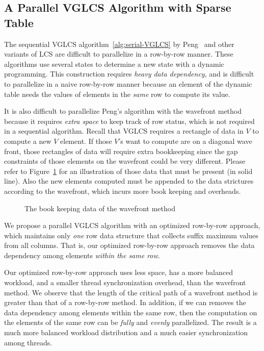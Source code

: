 \subsection{A Parallel VGLCS Algorithm with Sparse Table}

The sequential VGLCS algorithm~\ref{alg:serial-VGLCS} by
Peng~\cite{Peng2011TheLC} and other variants of LCS are difficult to
parallelize in a row-by-row manner.  These algorithms use several
states to determine a new state with a dynamic programming.  This
construction requires {\em heavy data dependency}, and is difficult to
parallelize in a naive row-by-row manner because an element of the
dynamic table needs the values of elements in the {\em same} row to
compute its value.

It is also difficult to parallelize Peng's algorithm with the
wavefront method because it requires {\em extra space} to keep track
of row status, which is not required in a sequential algorithm.
Recall that VGLCS requires a rectangle of data in $V$ to compute a new
$V$ element.  If those $V$'s want to compute are on a diagonal wave
front, those rectangles of data will require extra bookkeeping since
the gap constraints of those elements on the wavefront could be very
different.  Please refer to Figure~\ref{fig:fig-VGLCS-dp-wavefront}
for an illustration of those data that must be present (in solid
line).  Also the new elements computed must be appended to the data
strictures according to the wavefront, which incurs more book keeping
and overheads.

\begin{figure}[!thb]
  \centering {} 
  \caption{The book keeping data of the wavefront method}
  \label{fig:fig-VGLCS-dp-wavefront}
\end{figure}

We propose a parallel VGLCS algorithm with an optimized row-by-row
approach, which maintains only {\em one} row data structure that
collects suffix maximum values from all columns.  That is, our
optimized row-by-row approach removes the data dependency among
elements {\em within the same row}.

Our optimized row-by-row approach uses less space, has a more balanced
workload, and a smaller thread synchronization overhead, than the
wavefront method.  We observe that the length of the critical path of
a wavefront method is greater than that of a row-by-row method.  In
addition, if we can removes the data dependency among elements within
the same row, then the computation on the elements of the same row can
be {\em fully} and {\em evenly} parallelized.  The result is a much
more balanced workload distribution and a much easier synchronization
among threads.


